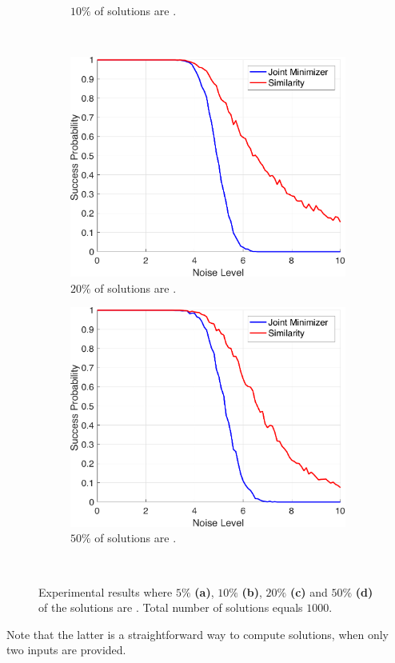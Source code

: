 \begin{figure}[t!]
\begin{subfigure}[b]{.49\textwidth}
      \caption{$10\%$ of solutions are \good.}
      \label{fig:gnm_10}
  \end{subfigure}
  \\[.5cm]
  \begin{subfigure}[b]{.49\textwidth}
      \includegraphics[width=\linewidth]{figures/ch_generic_approach/gnm_g200_b800}
      \caption{$20\%$ of solutions are \good.}
      \label{fig:gnm_20}
  \end{subfigure}
  \hfill
  \begin{subfigure}[b]{.49\textwidth}
      \includegraphics[width=\linewidth]{figures/ch_generic_approach/gnm_g500_b500}
      \caption{$50\%$ of solutions are \good.}
      \label{fig:gnm_50}
  \end{subfigure}
  \\[.5cm]
  \caption{Experimental results where $5\%$ \textbf{(a)}, $10\%$ \textbf{(b)},
    $20\%$ \textbf{(c)} and $50\%$ \textbf{(d)} of the solutions are \good.
    Total number of solutions equals $1000$.}
  \label{fig:gnm}
\end{figure}
Note that the latter is a straightforward way to compute solutions, when only two
inputs are provided. 

